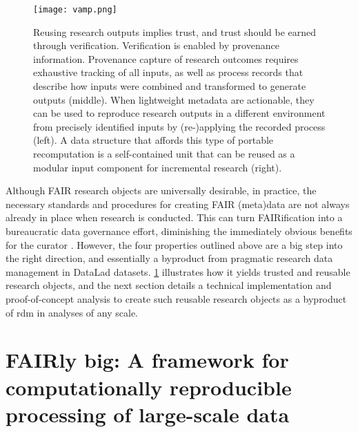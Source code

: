 \begin{figure}
	\centering
	\texttt{[image: vamp.png]}
	\caption[DataLad datasets as reusable research objects]{Reusing research outputs implies trust, and trust should be earned through verification. Verification is enabled by provenance information. Provenance capture of research outcomes requires exhaustive tracking of all inputs, as well as process records that describe how inputs were combined and transformed to generate outputs (middle). When lightweight metadata are actionable, they can be used to reproduce research outputs in a different environment from precisely identified inputs by (re-)applying the recorded process (left). A data structure that affords this type of portable recomputation is a self-contained unit that can be reused as a modular input component for incremental research (right).
	}
	\label{fig:vamp}
\end{figure}





Although FAIR research objects are universally desirable, in practice, the necessary standards and procedures for creating FAIR (meta)data are not always already in place when research is conducted.
This can turn FAIRification into a bureaucratic data governance effort, diminishing the immediately obvious benefits for the curator \citep{zehl2016handling}.
However, the four properties outlined above are a big step into the right direction, and essentially a byproduct from pragmatic research data management in DataLad datasets.
\cref{fig:vamp} illustrates how it yields trusted and reusable research objects, and the next section details a technical implementation and proof-of-concept analysis to create such reusable research objects as a byproduct of \gls{rdm} in analyses of any scale.

\pagebreak

\section{FAIRly big: A framework for computationally reproducible processing of large-scale data}

